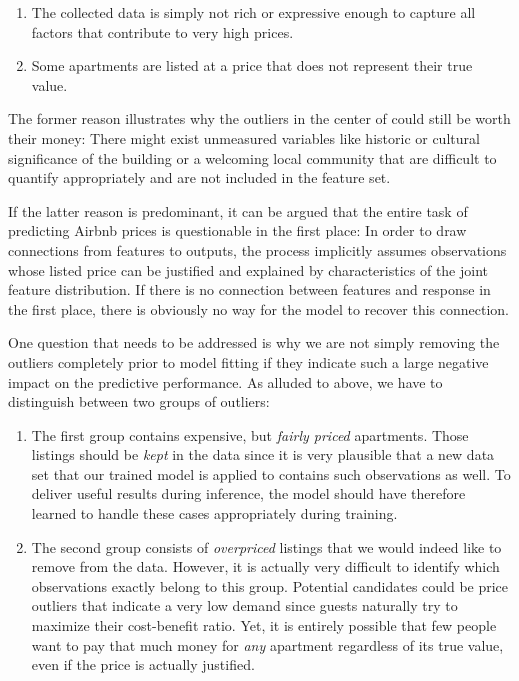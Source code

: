 \begin{enumerate}
  \item The collected data is simply not rich or expressive enough to capture all factors that contribute to very high prices.
  \item Some apartments are listed at a price that does not represent their true value.
\end{enumerate}


The former reason illustrates why the outliers in the center of  could still be worth their money:
There might exist unmeasured variables like historic or cultural significance of the building or a welcoming local community that are difficult to quantify appropriately and are not included in the feature set.

If the latter reason is predominant, it can be argued that the entire task of predicting Airbnb prices is questionable in the first place:
In order to draw connections from features to outputs, the process implicitly assumes observations whose listed price can be justified and explained by characteristics of the joint feature distribution.
If there is no connection between features and response in the first place, there is obviously no way for the model to recover this connection.

One question that needs to be addressed is why we are not simply removing the outliers completely prior to model fitting if they indicate such a large negative impact on the predictive performance.
As alluded to above, we have to distinguish between two groups of outliers:

\begin{enumerate}
  \item The first group contains expensive, but \emph{fairly priced} apartments.
        Those listings should be \emph{kept} in the data since it is very plausible that a new data set that our trained model is applied to contains such observations as well.
        To deliver useful results during inference, the model should have therefore learned to handle these cases appropriately during training.
  \item The second group consists of \emph{overpriced} listings that we would indeed like to remove from the data.
        However, it is actually very difficult to identify which observations exactly belong to this group.
        Potential candidates could be price outliers that indicate a very low demand since guests naturally try to maximize their cost-benefit ratio.
        Yet, it is entirely possible that few people want to pay that much money for \emph{any} apartment regardless of its true value, even if the price is actually justified.
\end{enumerate}

